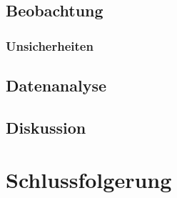 \documentclass[
	a4paper,
	12pt,
	pagesize,
	ngerman
]{scrartcl}
\begin{document}
	\subsection{Beobachtung}
	\subsubsection{Unsicherheiten} %
	\subsection{Datenanalyse}
	
	\subsection{Diskussion}
	
	\section{Schlussfolgerung}
	
\end{document}
